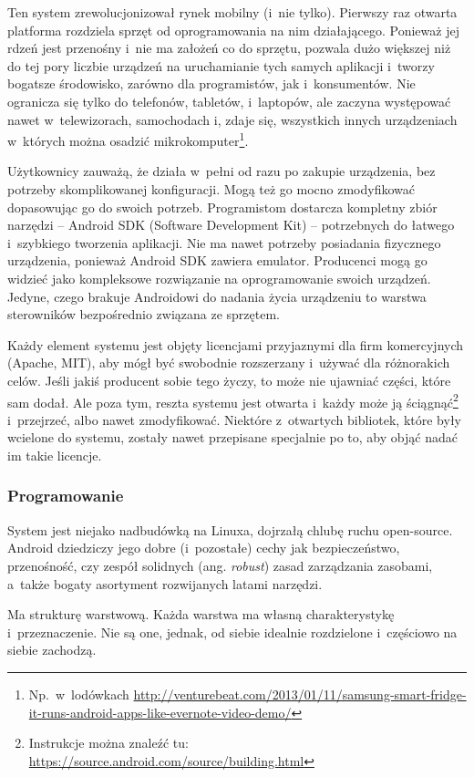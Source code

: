 Ten system zrewolucjonizował rynek mobilny (i~nie tylko). Pierwszy raz otwarta platforma rozdziela sprzęt od oprogramowania na nim działającego. Ponieważ jej rdzeń jest przenośny i~nie ma założeń co do sprzętu, pozwala dużo większej niż do tej pory liczbie urządzeń na uruchamianie tych samych aplikacji i~tworzy bogatsze środowisko, zarówno dla programistów, jak i~konsumentów. Nie ogranicza się tylko do telefonów, tabletów, i~laptopów, ale zaczyna występować nawet w~telewizorach, samochodach i, zdaje się, wszystkich innych urządzeniach w~których można osadzić mikrokomputer\footnote{Np.\ w~lodówkach \url{http://venturebeat.com/2013/01/11/samsung-smart-fridge-it-runs-android-apps-like-evernote-video-demo/}}.

Użytkownicy zauważą, że działa w~pełni od razu po zakupie urządzenia, bez potrzeby skomplikowanej konfiguracji. Mogą też go mocno zmodyfikować dopasowując go do swoich potrzeb.
Programistom dostarcza kompletny zbiór narzędzi -- Android SDK (Software Development Kit) -- potrzebnych do łatwego i~szybkiego tworzenia aplikacji. Nie ma nawet potrzeby posiadania fizycznego urządzenia, ponieważ Android SDK zawiera emulator.
Producenci mogą go widzieć jako kompleksowe rozwiązanie na oprogramowanie swoich urządzeń. Jedyne, czego brakuje Androidowi do nadania życia urządzeniu to warstwa sterowników bezpośrednio związana ze sprzętem.

Każdy element systemu jest objęty licencjami przyjaznymi dla firm komercyjnych (Apache, MIT), aby mógł być swobodnie rozszerzany i~używać dla różnorakich celów.
Jeśli jakiś producent sobie tego życzy, to może nie ujawniać części, które sam dodał. Ale poza tym, reszta systemu jest otwarta i~każdy może ją ściągnąć\footnote{Instrukcje można znaleźć tu: \url{https://source.android.com/source/building.html}} i~przejrzeć, albo nawet zmodyfikować.
Niektóre z~otwartych bibliotek, które były wcielone do systemu, zostały nawet przepisane specjalnie po to, aby objąć nadać im takie licencje.

\subsubsection{Programowanie}
System jest niejako nadbudówką na Linuxa, dojrzałą chlubę ruchu open-source. Android dziedziczy jego dobre (i~pozostałe) cechy jak bezpieczeństwo, przenośność, czy zespół solidnych (ang. \emph{robust}) zasad zarządzania zasobami, a~także bogaty asortyment rozwijanych latami narzędzi.

Ma strukturę warstwową. Każda warstwa ma własną charakterystykę i~przeznaczenie. Nie są one, jednak, od siebie idealnie rozdzielone i~częściowo na siebie zachodzą.

